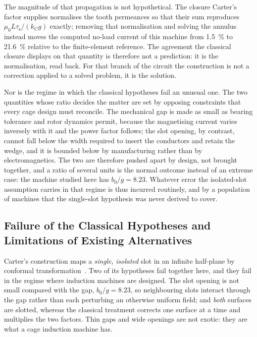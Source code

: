 \documentclass[10pt,a4paper,twocolumn]{article}
\theoremstyle{plain}
\theoremstyle{remark}
\begin{document}
The magnitude of that propagation is not hypothetical. The closure
Carter's factor supplies normalises the tooth permeances so that their
sum reproduces $\mu_0 L\tau_{\mathrm{s}}/(k_{\mathrm{C}}g)$ exactly;
removing that normalisation and solving the annulus instead moves the
computed no-load current of this machine from \SI{+1.5}{\percent} to
\SI{+21.6}{\percent} relative to the finite-element reference. The
agreement the classical closure displays on that quantity is therefore
not a prediction: it is the normalisation, read back. For that branch of
the circuit the construction is not a correction applied to a solved
problem, it is the solution.

Nor is the regime in which the classical hypotheses fail an unusual
one. The two quantities whose ratio decides the matter are set by
opposing constraints that every cage design must reconcile. The
mechanical gap is made as small as bearing tolerance and rotor dynamics
permit, because the magnetising current varies inversely with it and
the power factor follows; the slot opening, by contrast, cannot fall
below the width required to insert the conductors and retain the wedge,
and it is bounded below by manufacturing rather than by
electromagnetics. The two are therefore pushed apart by design, not
brought together, and a ratio of several units is the normal outcome
instead of an extreme case: the machine studied here has
$b_0/g=\num{8.23}$. Whatever error the isolated-slot assumption carries
in that regime is thus incurred routinely, and by a population of
machines that the single-slot hypothesis was never derived to
cover.

\subsection{Failure of the Classical Hypotheses and Limitations of Existing Alternatives}

Carter's construction maps a \emph{single, isolated} slot in an infinite
half-plane by conformal transformation~\cite{carter,pyrhonen}. Two of
its hypotheses fail together here, and they fail in the regime where
induction machines are designed. The slot opening is not small compared
with the gap, $b_0/g=\num{8.23}$, so neighbouring slots interact
through the gap rather than each perturbing an otherwise uniform field;
and \emph{both} surfaces are slotted, whereas the classical treatment
corrects one surface at a time and multiplies the two factors. Thin gaps
and wide openings are not exotic: they are what a cage induction machine
has.
\end{document}
